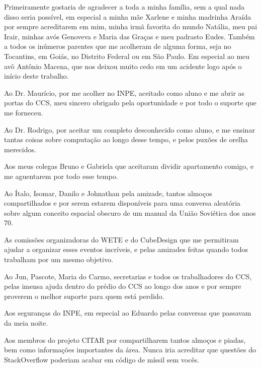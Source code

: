 
\begin{agradecimentos}  %

\hypertarget{estilo:agradecimentos}{} %

Primeiramente gostaria de agradecer a toda a minha família, sem a qual nada disso seria possível, em especial a minha mãe Xarlene e minha madrinha Araída por sempre acreditarem em mim, minha irmã favorita do mundo Natália, meu pai Irair, minhas avós Genoveva e Maria das Graças e meu padrasto Eudes.
Também a todos os inúmeros parentes que me acolheram de alguma forma, seja no Tocantins, em Goiás, no Distrito Federal ou em São Paulo.
Em especial ao meu avô Antônio Macena, que nos deixou muito cedo em um acidente logo após o início deste trabalho.

Ao Dr. Maurício, por me acolher no INPE, aceitado como aluno e me abrir as portas do CCS, meu sincero obrigado pela oportunidade e por todo o suporte que me forneceu.

Ao Dr. Rodrigo, por aceitar um completo desconhecido como aluno, e me ensinar tantas coisas sobre computação ao longo desse tempo, e pelos puxões de orelha merecidos.

Aos meus colegas Bruno e Gabriela que aceitaram dividir apartamento comigo, e me aguentarem por todo esse tempo.

Ao Ítalo, Isomar, Danilo e Johnathan pela amizade, tantos almoços compartilhados e por serem estarem disponíveis para uma conversa aleatória sobre algum conceito espacial obscuro de um manual da União Soviética dos anos 70.

As comissões organizadoras do WETE e do CubeDesign que me permitiram ajudar a organizar esses eventos incríveis, e pelas amizades feitas quando todos trabalham por um mesmo objetivo.

Ao Jun, Pascote, Maria do Carmo, secretarias e todos os trabalhadores do CCS, pelas imensa ajuda dentro do prédio do CCS ao longo dos anos e por sempre proverem o melhor suporte para quem está perdido.

Aos seguranças do INPE, em especial ao Eduardo pelas conversas que passavam da meia noite.

Aos membros do projeto CITAR por compartilharem tantos almoços e piadas, bem como informações importantes da área.
Nunca iria acreditar que questões do StackOverflow poderiam acabar em código de míssil sem vocês.


\end{agradecimentos}
